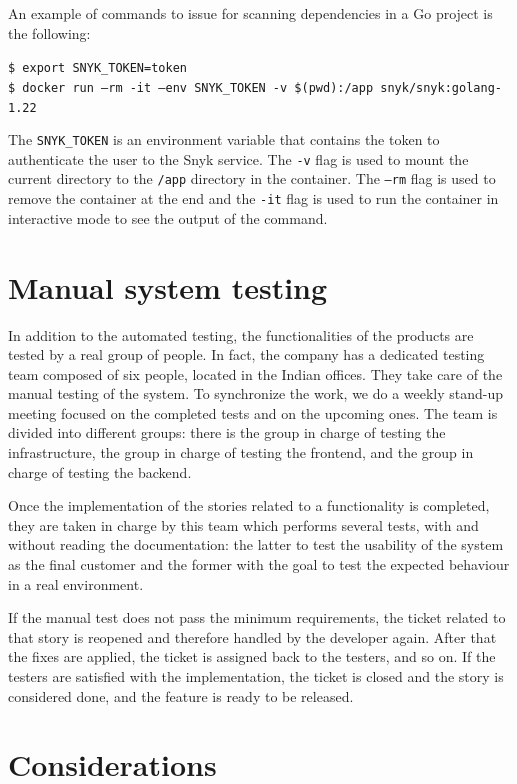 An example of commands to issue for scanning dependencies in a Go project is the following:
\begin{mdframed}
  \texttt{\$ export SNYK\_TOKEN=token}\\
  \texttt{\$ docker run --rm -it --env SNYK\_TOKEN -v \$(pwd):/app snyk/snyk:golang-1.22}
\end{mdframed}
The \texttt{SNYK\_TOKEN} is an environment variable that contains the token to authenticate the user to the Snyk service. The \texttt{-v} flag is used to mount the current directory to the \texttt{/app} directory in the container. The \texttt{--rm} flag is used to remove the container at the end and the \texttt{-it} flag is used to run the container in interactive mode to see the output of the command.

\section{Manual system testing}

In addition to the automated testing, the functionalities of the products are tested by a real group of people. In fact, the company has a dedicated testing team composed of six people, located in the Indian offices. They take care of the manual testing of the system. To synchronize the work, we do a weekly stand-up meeting focused on the completed tests and on the upcoming ones. The team is divided into different groups: there is the group in charge of testing the infrastructure, the group in charge of testing the frontend, and the group in charge of testing the backend.

Once the implementation of the stories related to a functionality is completed, they are taken in charge by this team which performs several tests, with and without reading the documentation: the latter to test the usability of the system as the final customer and the former with the goal to test the expected behaviour in a real environment.

If the manual test does not pass the minimum requirements, the ticket related to that story is reopened and therefore handled by the developer again. After that the fixes are applied, the ticket is assigned back to the testers, and so on. If the testers are satisfied with the implementation, the ticket is closed and the story is considered done, and the feature is ready to be released.

\section{Considerations}

